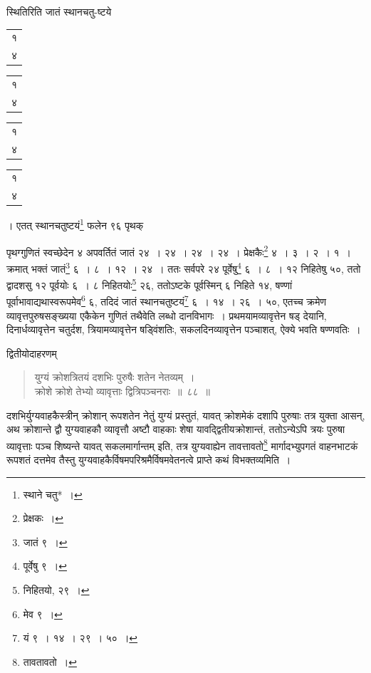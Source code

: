 \documentclass[10pt, openany]{book}
\begin{document}
{{{{स्थितिरिति जातं स्थानचतु-ष्टये\begin{tabular}{r|}१\\ ४\end{tabular}\begin{tabular}{r|}१\\ ४\end{tabular}\begin{tabular}{r|}१\\ ४\end{tabular}\begin{tabular}{r}१\\ ४\end{tabular}। एतत्
स्थानचतुष्टयं\renewcommand{\thefootnote}{\s ३}\footnote{\s स्थाने चतु*~।} फलेन ९६ पृथक्}
{पृथग्गुणितं स्वच्छेदेन ४ अपवर्तितं जातं २४~। २४~। २४~। २४~।
प्रेक्षकैः\renewcommand{\thefootnote}{\s ४}\footnote{\s प्रेक्षकः~।} ४~। ३~। २~। १~। क्रमात्}
{भक्तं जातं\renewcommand{\thefootnote}{\s ५}\footnote{\s जातं ९~।} ६~। ८~। १२~। २४~। ततः सर्वपरे २४ पूर्वेषु\renewcommand{\thefootnote}{\s ६}\footnote{\s पूर्वेषु ९~।} ६~। ८~।
१२ निहितेषु ५०, ततो}
{द्वादशसु १२ पूर्वयोः ६~। ८ निहितयोः\renewcommand{\thefootnote}{\s ७}\footnote{\s निहितयो, २९~।} २६, ततोऽष्टके पूर्वस्मिन् ६
निहिते १४, षण्णां}
{पूर्वाभावाद्यथास्वरूपमेव\renewcommand{\thefootnote}{\s ८}\footnote{\s *मेव ९~।} ६, तदिदं जातं स्थानचतुष्टयं\renewcommand{\thefootnote}{\s ९}\footnote{\s *यं ९~। १४~। २९~। ५०~।} ६~। १४~।
२६~। ५०, एतच्च क्रमेण}
{व्यावृत्तपुरुषसङ्ख्यया एकैकेन गुणितं तथैवेति लब्धो दानविभागः~।
प्रथमयामव्यावृत्तेन षड् देयानि, दिनार्धव्यावृत्तेन चतुर्दश, त्रियामव्यावृत्तेन षड्विंशतिः,
सकलदिनव्यावृत्तेन पञ्चाशत्,}
{ऐक्ये भवति षण्णवतिः~।}
\vspace{3mm}

{द्वितीयोदाहरणम्\textemdash}

\begin{quote}
    
{\eg युग्यं क्रोशत्रितयं दशभिः पुरुषैः शतेन नेतव्यम्~। \\
 क्रोशे क्रोशे तेभ्यो व्यावृत्ताः द्वित्रिपञ्चनराः~॥~८८~॥}\end{quote}

{दशभिर्युग्यवाहकैस्त्रीन् क्रोशान् रूपशतेन नेतुं युग्यं प्रस्तुतं,
यावत् क्रोशमेकं दशापि}
{पुरुषाः तत्र युक्ता आसन्, अथ क्रोशान्ते द्वौ युग्यवाहकौ व्यावृत्तौ
अष्टौ वाहकाः शेषा यावद्द्वितीयक्रोशान्तं, ततोऽन्येऽपि त्रयः पुरुषा व्यावृत्ताः पञ्च शिष्यन्ते
यावत् सकलमार्गान्तम् इति, तत्र}
{युग्यवाह्येन तावत्तावतो\renewcommand{\thefootnote}{\s १०}\footnote{\s तावतावतो~।} मार्गादभ्युपगतं वाहनभाटकं रूपशतं दत्तमेव
तैस्तु युग्यवाहकैर्विषमपरिश्रमैर्विषमवेतनत्वे प्राप्ते कथं विभक्तव्यमिति~।}

}}}
\end{document}
